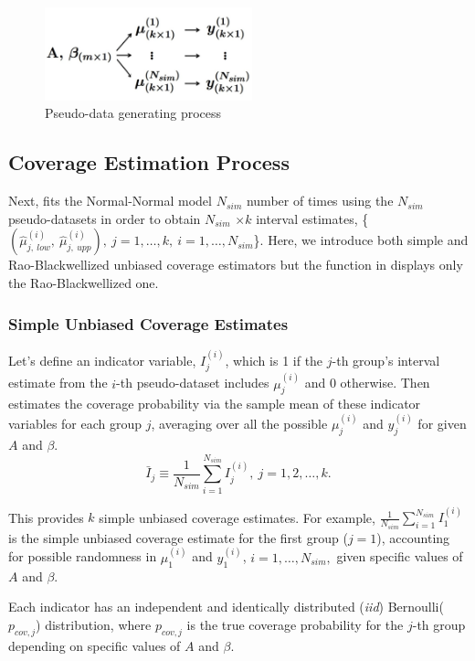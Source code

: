 \documentclass[article]{jss}
\begin{document}
\begin{figure}[h]
\begin{center}
\includegraphics[width=6cm]{process.png}
\caption{Pseudo-data generating process}
\label{fig:pseudo}
\end{center}
\end{figure}

\subsection{Coverage Estimation Process}
Next,  fits the Normal-Normal model  $N_{sim}$ number of times using the $N_{sim}$ pseudo-datasets in order to obtain $N_{sim}$ $\times k$ interval estimates,  \{$(\hat{\mu}^{(i)}_{j, ~low}, ~\hat{\mu}^{(i)}_{j, ~upp}), ~j=1,\ldots, k,~ i=1, \ldots, N_{sim}$\}.  Here, we introduce both simple and Rao-Blackwellized unbiased coverage estimators but the function  in  displays only the Rao-Blackwellized one.

\subsubsection{Simple Unbiased Coverage Estimates}
Let's define an indicator variable, $I^{(i)}_{j}$, which is 1 if the $j$-th group's interval estimate from the $i$-th pseudo-dataset includes $\mu^{(i)}_{j}$ and 0 otherwise. Then  estimates the coverage probability via the sample mean of these indicator variables for each group $j$, averaging over all the possible $\mu^{(i)}_{j}$ and $y^{(i)}_{j}$ for given $A$ and $\beta$. 
\begin{equation}
\bar{I}_{j}\equiv \frac{1}{N_{sim}}\sum_{i=1}^{N_{sim}}I^{(i)}_{j},~ j=1, 2, \ldots, k.
\end{equation}

This provides $k$ simple unbiased coverage estimates. For example, $\frac{1}{N_{sim}}\sum_{i=1}^{N_{sim}}I^{(i)}_{1}$ is the simple unbiased coverage estimate for the first group ($j=1$), accounting for possible randomness in $\mu^{(i)}_{1}$ and $y^{(i)}_{1}$, $i=1, \ldots, N_{sim},$ given specific values of $A$ and $\beta$. 

Each indicator has an independent and identically distributed (\emph{iid}) Bernoulli($p_{cov, j}$) distribution, where $p_{cov, j}$ is the true coverage probability for the $j$-th group depending on specific values of $A$ and $\beta$. 
\end{document}

